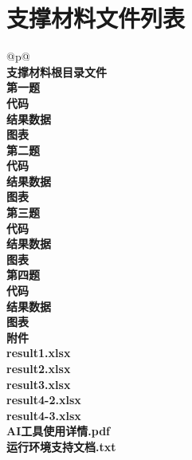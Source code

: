 \documentclass{cumcm2026}
\newcommand{\flhead}[1]{\bfseries #1}      %
\newcommand{\flitem}[1]{\hspace{2em}#1}    %
\begin{document}
\vspace{-1.5em}
\makeatletter
\renewcommand{\bibsection}{%
  \section*{参考文献}
  \addcontentsline{toc}{section}{参考文献}
}
\makeatother




\CumcmAppendix

\section{支撑材料文件列表}

\begin{table}[H]
  \caption{支撑材料文件列表}
  \label{tab:appendix-file-list}
  \small
  \renewcommand{\arraystretch}{0.9} %
  \setlength{\tabcolsep}{4pt} %
  \begin{tabular}{@{}p{\dimexpr{}\tabcolsep\relax}@{}}
    \toprule
     \\
    \midrule
\flhead{支撑材料根目录文件} \\
\flhead{第一题} \\
\flitem{\quad 代码} \\
\flitem{\quad 结果数据} \\
\flitem{\quad 图表} \\
\flhead{第二题} \\
\flitem{\quad 代码} \\
\flitem{\quad 结果数据} \\
\flitem{\quad 图表} \\
\flhead{第三题} \\
\flitem{\quad 代码} \\
\flitem{\quad 结果数据} \\
\flitem{\quad 图表} \\
\flhead{第四题} \\
\flitem{\quad 代码} \\
\flitem{\quad 结果数据} \\
\flitem{\quad 图表} \\
\flhead{附件} \\
\flitem{result1.xlsx} \\
\flitem{result2.xlsx} \\
\flitem{result3.xlsx} \\
\flitem{result4-2.xlsx} \\
\flitem{result4-3.xlsx} \\
\flhead{AI工具使用详情.pdf} \\
\flhead{运行环境支持文档.txt} \\
    \bottomrule
  \end{tabular}
\end{table}
\end{document}
